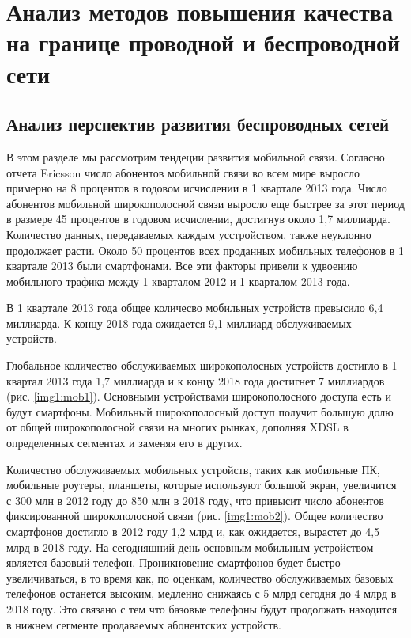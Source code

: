 \chapter{Анализ методов повышения качества на границе проводной и беспроводной сети} \label{chapt1}


\section{Анализ перспектив развития беспроводных сетей} \label{sect1_0}
В этом разделе мы рассмотрим тендеции развития мобильной связи.
Согласно отчета Ericsson \cite{ericsson} число абонентов мобильной связи во всем мире выросло примерно на 8 процентов в годовом исчислении в 1 квартале 2013 года. Число абонентов мобильной широкополосной связи выросло еще быстрее за этот период в размере 45 процентов в годовом исчислении, достигнув около 1,7 миллиарда. Количество данных, передаваемых каждым усстройством, также неуклонно продолжает расти. Около 50 процентов всех проданных мобильных телефонов в 1 квартале 2013 были смартфонами. Все эти факторы привели к удвоению мобильного трафика между 1 кварталом 2012 и 1 кварталом 2013 года. 

В 1 квартале 2013 года общее количесво мобильных устройств превысило 6,4 миллиарда. К концу 2018 года ожидается 9,1 миллиард обслуживаемых устройств. 

Глобальное количество обслуживаемых широкополосных устройств достигло в 1 квартал 2013 года 1,7 миллиарда и к концу 2018 года достигнет 7 миллиардов (рис. \ref{img1:mob1}). Основными устройствами широкополосного доступа есть и будут смартфоны. Мобильный широкополосный доступ получит большую долю от общей широкополосной связи на многих рынках, дополняя XDSL в определенных сегментах и заменяя его в других. 

Количество обслуживаемых мобильных устройств, таких как мобильные ПК, мобильные роутеры, планшеты, которые используют большой экран, увеличится с 300 млн в 2012 году до 850 млн в 2018 году, что привысит число абонентов фиксированной широкополосной связи (рис. \ref{img1:mob2}).
Общее количество смартфонов достигло в 2012 году 1,2 млрд и, как ожидается, вырастет до 4,5 млрд в 2018 году. На сегодняшний день основным мобильным устройством является базовый телефон. Проникновение смартфонов будет быстро увеличиваться, в то время как, по оценкам, количество обслуживаемых базовых телефонов останется высоким, медленно снижаясь с 5 млрд сегодня до 4 млрд в 2018 году. Это связано с тем что базовые телефоны будут продолжать находится в нижнем сегменте продаваемых абонентских устройств.

